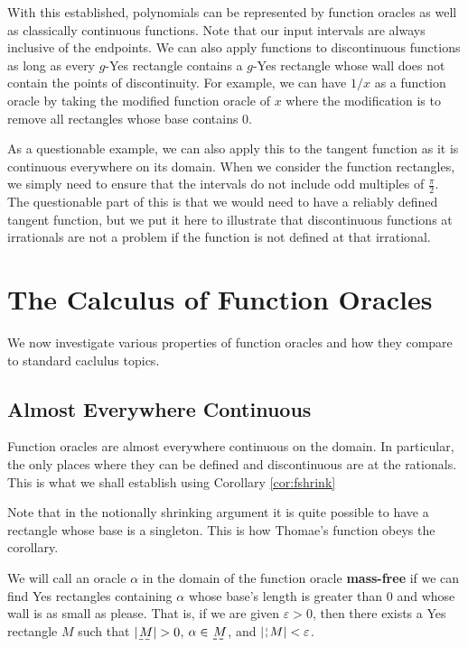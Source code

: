 \documentclass[12pt]{article}
\theoremstyle{remark}
\begin{document}
With this established, polynomials can be represented by function oracles as well as classically continuous functions. Note that our input intervals are always inclusive of the endpoints. We can also apply functions to discontinuous functions as long as every $g$-Yes rectangle contains a $g$-Yes rectangle whose wall does not contain the points of discontinuity. For example, we can have $1/x$ as a function oracle by taking the modified function oracle of $x$ where the modification is to remove all rectangles whose base contains 0. 

As a questionable example, we can also apply this to the tangent function as it is continuous everywhere on its domain. When we consider the function rectangles, we simply need to ensure that the intervals do not include odd multiples of $\frac{\pi}{2}$. The questionable part of this is that we would need to have a reliably defined tangent function, but we put it here to illustrate that discontinuous functions at irrationals are not a problem if the function is not defined at that irrational. 


\section{The Calculus of Function Oracles}

We now investigate various properties of function oracles and how they compare to standard caclulus topics. 

\subsection{Almost Everywhere Continuous}

Function oracles are almost everywhere continuous on the domain. In particular, the only places where they can be defined and discontinuous are at the rationals. This is what we shall establish using Corollary \ref{cor:fshrink}

Note that in the notionally shrinking argument it is quite possible to have a rectangle whose base is a singleton. This is how Thomae's function obeys the corollary. 

We will call an oracle $\alpha$ in the domain of the function oracle \textbf{mass-free} if we can find Yes rectangles containing $\alpha$ whose base's length is greater than 0 and whose wall is as small as please. That is, if we are given $\varepsilon > 0$, then there exists a Yes rectangle $M$ such that $|\base{M}| > 0$, $\alpha \in \base{M}$, and $|\wall{M}| < \varepsilon$.
 
\end{document}
